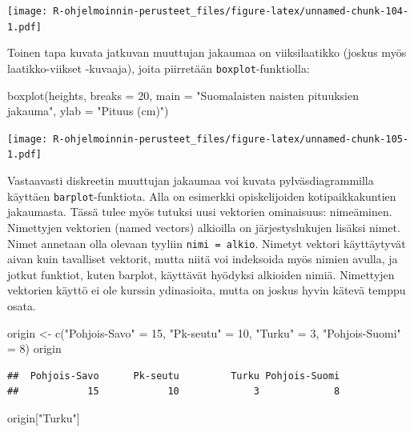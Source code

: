 \documentclass[
]{book}
\newenvironment{Shaded}{\begin{snugshade}}{\end{snugshade}}
\newcommand{\AttributeTok}[1]{\textcolor[rgb]{0.77,0.63,0.00}{#1}}
\newcommand{\DecValTok}[1]{\textcolor[rgb]{0.00,0.00,0.81}{#1}}
\newcommand{\FunctionTok}[1]{\textcolor[rgb]{0.00,0.00,0.00}{#1}}
\newcommand{\NormalTok}[1]{#1}
\newcommand{\OtherTok}[1]{\textcolor[rgb]{0.56,0.35,0.01}{#1}}
\newcommand{\StringTok}[1]{\textcolor[rgb]{0.31,0.60,0.02}{#1}}
\begin{document}
\texttt{[image: R-ohjelmoinnin-perusteet\_files/figure-latex/unnamed-chunk-104-1.pdf]}

Toinen tapa kuvata jatkuvan muuttujan jakaumaa on viiksilaatikko (joskus myös laatikko-viikset -kuvaaja), joita piirretään \texttt{boxplot}-funktiolla:

\begin{Shaded}
\begin{Highlighting}[]
\FunctionTok{boxplot}\NormalTok{(heights, }\AttributeTok{breaks =} \DecValTok{20}\NormalTok{, }
     \AttributeTok{main =} \StringTok{"Suomalaisten naisten pituuksien jakauma"}\NormalTok{,}
     \AttributeTok{ylab =} \StringTok{"Pituus (cm)"}\NormalTok{)}
\end{Highlighting}
\end{Shaded}

\texttt{[image: R-ohjelmoinnin-perusteet\_files/figure-latex/unnamed-chunk-105-1.pdf]}

Vastaavasti diskreetin muuttujan jakaumaa voi kuvata pylväsdiagrammilla käyttäen \texttt{barplot}-funktiota. Alla on esimerkki opiskelijoiden kotipaikkakuntien jakaumasta. Tässä tulee myös tutuksi uusi vektorien ominaisuus: nimeäminen. Nimettyjen vektorien (named vectors) alkioilla on järjestyslukujen lisäksi nimet. Nimet annetaan olla olevaan tyyliin \texttt{nimi\ =\ alkio}. Nimetyt vektori käyttäytyvät aivan kuin tavalliset vektorit, mutta niitä voi indeksoida myös nimien avulla, ja jotkut funktiot, kuten barplot, käyttävät hyödyksi alkioiden nimiä. Nimettyjen vektorien käyttö ei ole kurssin ydinasioita, mutta on joskus hyvin kätevä temppu osata.

\begin{Shaded}
\begin{Highlighting}[]
\NormalTok{origin }\OtherTok{\textless{}{-}} \FunctionTok{c}\NormalTok{(}\StringTok{"Pohjois{-}Savo"} \OtherTok{=} \DecValTok{15}\NormalTok{, }\StringTok{"Pk{-}seutu"} \OtherTok{=} \DecValTok{10}\NormalTok{, }\StringTok{"Turku"} \OtherTok{=} \DecValTok{3}\NormalTok{,}
            \StringTok{"Pohjois{-}Suomi"} \OtherTok{=} \DecValTok{8}\NormalTok{)}
\NormalTok{origin}
\end{Highlighting}
\end{Shaded}

\begin{verbatim}
##  Pohjois-Savo      Pk-seutu         Turku Pohjois-Suomi 
##            15            10             3             8
\end{verbatim}

\begin{Shaded}
\begin{Highlighting}[]
\NormalTok{origin[}\StringTok{"Turku"}\NormalTok{]}
\end{Highlighting}
\end{Shaded}
\end{document}
